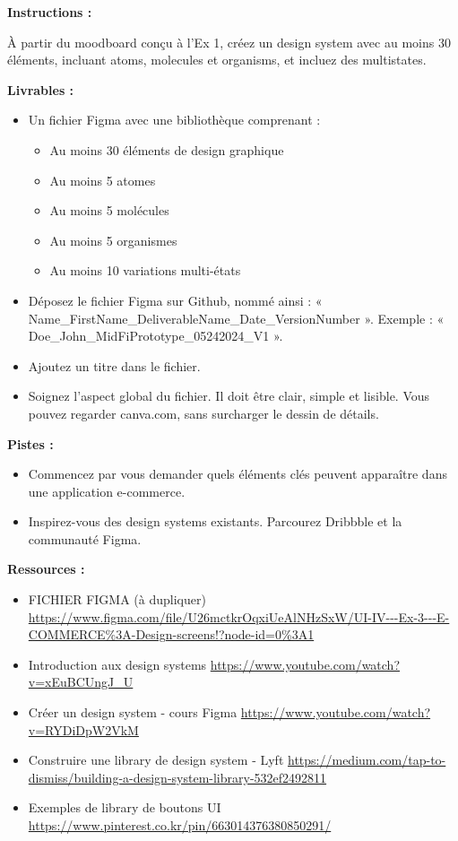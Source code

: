 \makeheaderfiles

\textbf{Instructions :}

À partir du moodboard conçu à l'Ex 1, créez un design system avec au moins 30 éléments, incluant atoms, molecules et organisms, et incluez des multistates.

\textbf{Livrables :}

\begin{itemize}
\item Un fichier Figma avec une bibliothèque comprenant :
\begin{itemize}
\item Au moins 30 éléments de design graphique
\item Au moins 5 atomes
\item Au moins 5 molécules
\item Au moins 5 organismes
\item Au moins 10 variations multi-états
\end{itemize}
\item Déposez le fichier Figma sur Github, nommé ainsi : « Name\_FirstName\_DeliverableName\_Date\_VersionNumber ». Exemple : « Doe\_John\_MidFiPrototype\_05242024\_V1 ».
\item Ajoutez un titre dans le fichier.
\item Soignez l'aspect global du fichier. Il doit être clair, simple et lisible. Vous pouvez regarder canva.com, sans surcharger le dessin de détails.
\end{itemize}

\textbf{Pistes :}

\begin{itemize}
\item Commencez par vous demander quels éléments clés peuvent apparaître dans une application e-commerce.
\item Inspirez-vous des design systems existants. Parcourez Dribbble et la communauté Figma.
\end{itemize}

\textbf{Ressources :}

\begin{itemize}
\item FICHIER FIGMA (à dupliquer) \url{https://www.figma.com/file/U26mctkrOqxiUeAlNHzSxW/UI-IV---Ex-3---E-COMMERCE%3A-Design-screens!?node-id=0%3A1}
\item Introduction aux design systems \url{https://www.youtube.com/watch?v=xEuBCUngJ_U}
\item Créer un design system - cours Figma \url{https://www.youtube.com/watch?v=RYDiDpW2VkM}
\item Construire une library de design system - Lyft \url{https://medium.com/tap-to-dismiss/building-a-design-system-library-532ef2492811}
\item Exemples de library de boutons UI \url{https://www.pinterest.co.kr/pin/663014376380850291/}
\end{itemize}

